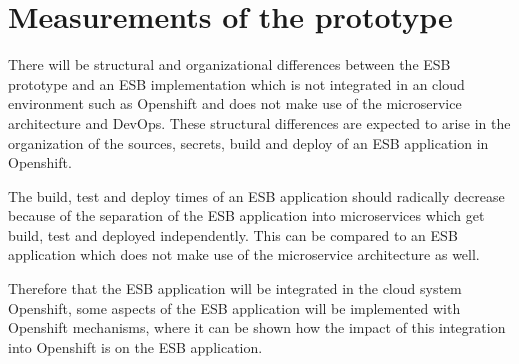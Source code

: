 \section{Measurements of the prototype}
\label{sec:empiric}
There will be structural and organizational differences between the ESB prototype and an ESB implementation which is not integrated in an cloud environment such as Openshift and does not make use of the microservice architecture and DevOps. These structural differences are expected to arise in the organization of the sources, secrets, build and deploy of an ESB application in Openshift. 

The build, test and deploy times of an ESB application should radically decrease because of the separation of the ESB application into microservices which get build, test and deployed independently. This can be compared to an ESB application which does not make use of the microservice architecture as well.

Therefore that the ESB application will be integrated in the cloud system Openshift, some aspects of the ESB application will be implemented with Openshift mechanisms, where it can be shown how the impact of this integration into Openshift is on the ESB application. 